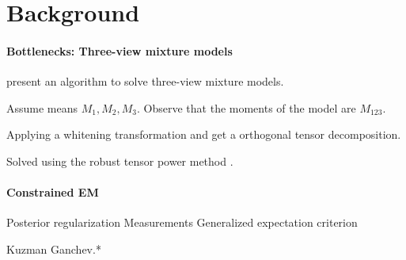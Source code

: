\section{Background}
\label{sec:background}

\paragraph{Bottlenecks: Three-view mixture models}

\citet{anandkumar12moments} present an algorithm to solve three-view mixture models.

Assume means $M_1, M_2, M_3$. Observe that the moments of the model are $M_{123}$.

Applying a whitening transformation and get a orthogonal tensor decomposition.

Solved using the robust tensor power method \citet{anandkumar13tensor}.


\paragraph{Constrained EM}

Posterior regularization
Measurements
Generalized expectation criterion

Kuzman Ganchev.*

